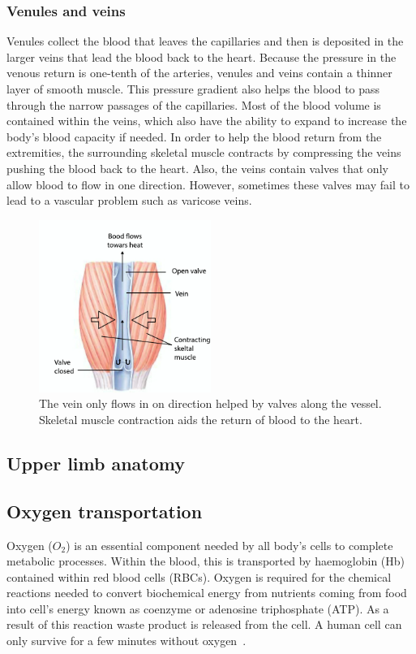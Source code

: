\subsubsection{Venules and veins}
Venules collect the blood that leaves the capillaries and then is deposited in the larger veins that lead the blood back to the heart. Because the pressure in the venous return is one-tenth of the arteries, venules and veins contain a thinner layer of smooth muscle. This pressure gradient also helps the blood to pass through the narrow passages of the capillaries. Most of the blood volume is contained within the veins, which also have the ability to expand to increase the body's blood capacity if needed. In order to help the blood return from the extremities, the surrounding skeletal muscle contracts by compressing the veins pushing the blood back to the heart. Also, the veins contain valves that only allow blood to flow in one direction. However, sometimes these valves may fail to lead to a vascular problem such as varicose veins. 

\begin{figure}[!htpb]
	\centering
	\includegraphics[width=0.5\textwidth,keepaspectratio]{figure2}    
	\caption[Venous return through skeletal muscle]{The vein only flows in on direction helped by valves along the vessel. Skeletal muscle contraction aids the return of blood to the heart. }
	\label{fig:venous return}
\end{figure}

\subsection{Upper limb anatomy}

\subsection{Oxygen transportation}
\label{section literature 1.2}
Oxygen ($O_2$) is an essential component needed by all body's cells to complete metabolic processes. Within the blood, this is transported by haemoglobin (Hb) contained within red blood cells (RBCs). Oxygen is required for the chemical reactions needed to convert biochemical energy from nutrients coming from food into cell's energy known as coenzyme or adenosine triphosphate (ATP). As a result of this reaction waste product is released from the cell. A human cell can only survive for a few minutes without oxygen~\cite{culmsee2005apoptosis}.

